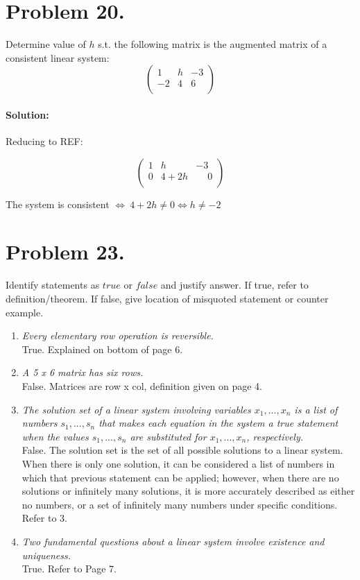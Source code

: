 \documentclass[11pt, notitlepage]{report}
\newenvironment{solution}{\paragraph{\small Solution:}}{\hfill}
\begin{document}
\newpage

\section{Problem 20.} 

Determine value of $h$ s.t. the following matrix is the augmented matrix of a consistent linear system:
\[\left(\begin{matrix}{}
  1& h& -3  \\
  -2& 4& 6 \\
\end{matrix}\right)\]

\begin{solution}
Reducing to REF:

\[\left(\begin{matrix}{}
  1& h& -3  \\
  0& 4+2h& \phantom{-}0 \\
\end{matrix}\right)\]

The system is consistent $\iff\ 4+2h \neq 0 \iff h\neq -2$
\end{solution}


\section{Problem 23.} 

Identify statements as $true$ or $false$ and justify answer. If true, refer to definition/theorem. If false, give location of misquoted statement or counter example.

\begin{enumerate}[label=\alph*.)]
	\item \textit{Every elementary row operation is reversible.} \\
		True. Explained on bottom of page 6.
	\item \textit{A 5 x 6 matrix has six rows.} \\
		  False. Matrices are row x col, definition given on page 4.
	\item \textit{The solution set of a linear system involving variables $x_1,...,x_n$ is a list of numbers $s_1,...,s_n$ that makes each equation in the system a true statement when the values $s_1,...,s_n$ are substituted for $x_1,...,x_n$, respectively.} \\
		False. The solution set is the set of all possible solutions to a linear system. When there is only one solution, it can be considered a list of numbers in which that previous statement can be applied; however, when there are no solutions or infinitely many solutions, it is more accurately described as either no numbers, or a set of infinitely many numbers under specific conditions. Refer to 3.
	\item \textit{Two fundamental questions about a linear system involve existence and uniqueness.}\\
	True. Refer to Page 7.
\end{enumerate}
\end{document}
